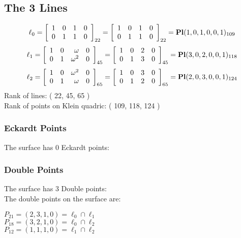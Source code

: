 \documentclass{article}
\begin{document}
{\subsection*{The 3 Lines}
$$
\ell_{0} = 
\left[
\begin{array}{*{4}{r}}
1 & 0 & 1 & 0\\
0 & 1 & 1 & 0\\
\end{array}
\right]
_{22}
=
\left[
\begin{array}{*{4}c}
1  & 0  & 1  & 0\\
0  & 1  & 1  & 0\\
\end{array}
\right]_{22}
={\rm\bf Pl}(1,0,1,0,0,1 )_{109}$$
$$
\ell_{1} = 
\left[
\begin{array}{*{4}{r}}
1 & 0 & \omega  & 0\\
0 & 1 & \omega^{2} & 0\\
\end{array}
\right]
_{45}
=
\left[
\begin{array}{*{4}c}
1  & 0  & 2  & 0\\
0  & 1  & 3  & 0\\
\end{array}
\right]_{45}
={\rm\bf Pl}(3,0,2,0,0,1 )_{118}$$
$$
\ell_{2} = 
\left[
\begin{array}{*{4}{r}}
1 & 0 & \omega^{2} & 0\\
0 & 1 & \omega  & 0\\
\end{array}
\right]
_{65}
=
\left[
\begin{array}{*{4}c}
1  & 0  & 3  & 0\\
0  & 1  & 2  & 0\\
\end{array}
\right]_{65}
={\rm\bf Pl}(2,0,3,0,0,1 )_{124}$$
Rank of lines: ( 22, 45, 65 )\\
Rank of points on Klein quadric: ( 109, 118, 124 )\\
\subsubsection*{Eckardt Points}
The surface has 0 Eckardt points:\\
\subsubsection*{Double Points}
The surface has 3 Double points:\\
The double points on the surface are:\\
\begin{multicols}{2}
\noindent
$P_{21} = ( 2, 3, 1, 0 ) = \ell_{0} \cap \ell_{1} $\\
$P_{18} = ( 3, 2, 1, 0 ) = \ell_{0} \cap \ell_{2} $\\
$P_{12} = ( 1, 1, 1, 0 ) = \ell_{1} \cap \ell_{2} $\\
\end{multicols}
}
\end{document}
